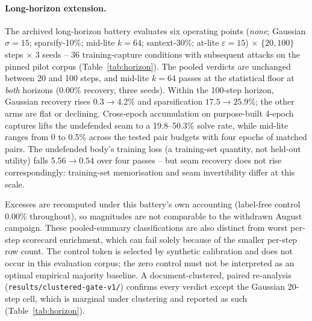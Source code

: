 \documentclass[11pt]{article}
\begin{document}
\paragraph{Long-horizon extension.}
The archived long-horizon battery evaluates six operating points
(\emph{none}; Gaussian $\sigma{=}15$; sparsify-10\%; mid-lite $k{=}64$;
santext-30\%; at-lite $\varepsilon{=}15$) $\times$ $\{20, 100\}$ steps
$\times$ 3 seeds -- 36 training-capture conditions with subsequent attacks on the pinned pilot corpus
(Table~\ref{tab:horizon}). The pooled verdicts are unchanged
between 20 and 100 steps, and
mid-lite $k{=}64$ passes at the statistical floor at \emph{both}
horizons (0.00\% recovery, three seeds). Within the 100-step horizon, Gaussian recovery rises
$0.3 \to 4.2\%$ and sparsification $17.5 \to 25.9\%$; the other arms are
flat or declining. Cross-epoch accumulation on purpose-built
4-epoch captures lifts the undefended seam to a 19.8--50.3\% solve rate,
while mid-lite ranges from 0 to 0.5\% across the tested pair budgets with four epochs of matched pairs.
The undefended body's training loss
(a training-set quantity, not held-out utility)
falls $5.56 \to 0.54$ over four passes -- but seam recovery does not
rise correspondingly: training-set memorisation and seam invertibility differ
at this scale.

Excesses are recomputed under this battery's own
accounting (label-free control 0.00\% throughout), so magnitudes are not
comparable to the withdrawn August campaign. These pooled-summary classifications are also distinct from worst per-step scorecard enrichment, which can fail solely because of the smaller per-step row count. The control token is selected by synthetic calibration and does not occur in this evaluation corpus; the zero control must not be interpreted as an optimal empirical majority baseline. A document-clustered, paired re-analysis
(\texttt{results/clustered-gate-v1/}) confirms every verdict except the
Gaussian 20-step cell, which is marginal under clustering and reported
as such (Table~\ref{tab:horizon}).
\end{document}
